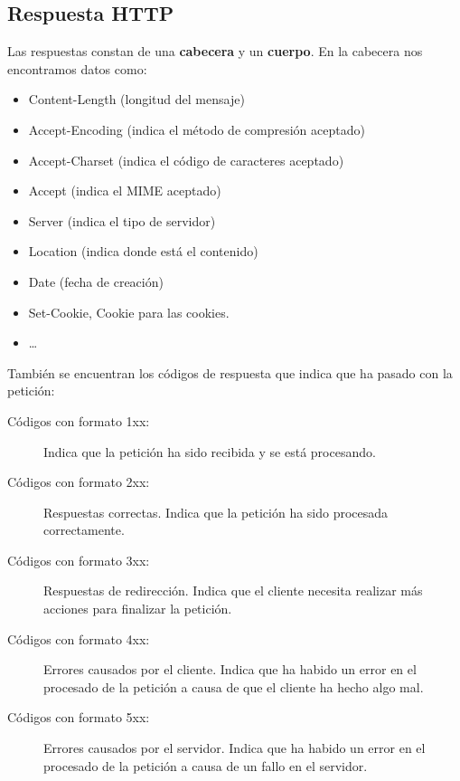 \documentclass[4paper]{article}
\newcommand{\HT}{HTTP}
\begin{document}
\subsection{Respuesta \HT}
Las respuestas constan de una \textbf{cabecera} y un \textbf{cuerpo}. En la cabecera nos encontramos datos como:
\begin{itemize}
\item Content-Length (longitud del mensaje)
\item Accept-Encoding (indica el método de compresión aceptado)
\item Accept-Charset (indica el código de caracteres aceptado)
\item Accept (indica el MIME aceptado)
\item Server (indica el tipo de servidor)
\item Location (indica donde está el contenido)
\item Date (fecha de creación)
\item Set-Cookie, Cookie para las cookies.
\item \dots
\end{itemize}
También se encuentran los códigos de respuesta que indica que ha pasado con la petición:
\begin{description}
\item[Códigos con formato 1xx:] Indica que la petición ha sido recibida y se está procesando.
\item[Códigos con formato 2xx:] Respuestas correctas. Indica que la petición ha sido procesada correctamente.
\item[Códigos con formato 3xx:] Respuestas de redirección. Indica que el cliente necesita realizar más acciones para finalizar la petición.
\item[Códigos con formato 4xx:] Errores causados por el cliente. Indica que ha habido un error en el procesado de la petición a causa de que el cliente ha hecho algo mal.
\item[Códigos con formato 5xx:] Errores causados por el servidor. Indica que ha habido un error en el procesado de la petición a causa de un fallo en el servidor.
\end{description}
\end{document}
